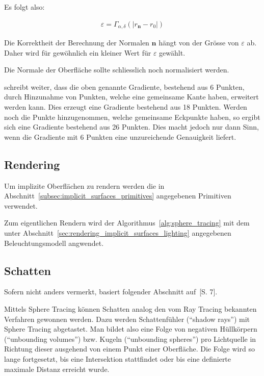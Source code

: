 Es folgt also:

\begin{gather}
    \varepsilon = \Gamma_{\alpha, \delta}(|r_{\bm{n}} - r_0|)
\end{gather}

Die Korrektheit der Berechnung der Normalen $\bm{n}$ hängt von der
Grösse von $\varepsilon$ ab. Daher wird für gewöhnlich ein kleiner Wert
für $\varepsilon$ gewählt.

Die Normale der Oberfläche sollte schliesslich noch normalisiert werden.

\cite{hart_ray_1989} schreibt weiter, dass die oben genannte Gradiente,
bestehend aus 6 Punkten, durch Hinzunahme von Punkten, welche eine
gemeinsame Kante haben, erweitert werden kann. Dies erzeugt eine
Gradiente bestehend aus 18 Punkten. Werden noch die Punkte
hinzugenommen, welche gemeinsame Eckpunkte haben, so ergibt sich eine
Gradiente bestehend aus 26 Punkten.
Dies macht jedoch nur dann Sinn, wenn die Gradiente mit 6 Punkten eine
unzureichende Genauigkeit liefert.

\subsection{Rendering}
\label{sec:rendering_implicit_surfaces_Rendering}

Um implizite Oberflächen zu rendern werden die in
Abschnitt~\ref{subsec:implicit_surfaces_primitives} angegebenen
Primitiven verwendet.

Zum eigentlichen Rendern wird der Algorithmus~\ref{alg:sphere_tracing}
mit dem unter Abschnitt~\ref{sec:rendering_implicit_surfaces_lighting}
angegebenen Beleuchtungsmodell angwendet.

\subsection{Schatten}
\label{sec:rendering_implicit_surfaces_shadows}

Sofern nicht anders vermerkt, basiert folgender Abschnitt
auf~\cite{reiner_smi_2011}[S. 7].

Mittels Sphere Tracing können Schatten analog den vom Ray Tracing
bekannten Verfahren gewonnen werden. Dazu werden Schattenfühler
(``shadow rays'') mit Sphere Tracing abgetastet. Man bildet also eine
Folge von negativen Hüllkörpern (``unbounding volumes'') bzw. Kugeln
(``unbounding spheres'') pro Lichtquelle in Richtung dieser ausgehend
von einem Punkt einer Oberfläche. Die Folge wird so lange fortgesetzt,
bis eine Intersektion stattfindet oder bis eine definierte maximale
Distanz erreicht wurde.

